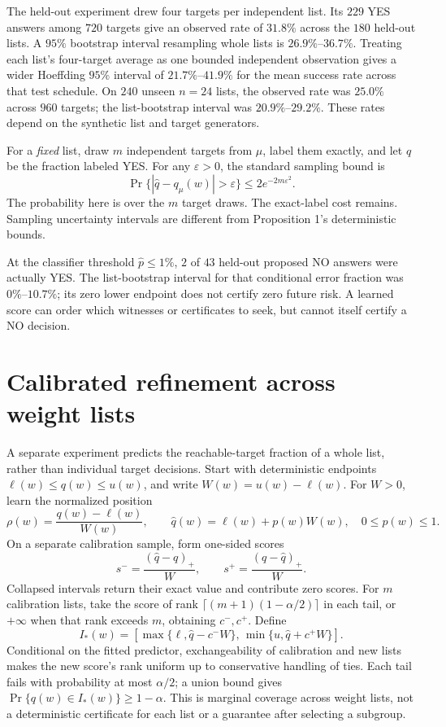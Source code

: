 \documentclass[10pt,english]{article}
\begin{document}
The held-out experiment drew four targets per independent list. Its \(229\) YES answers among \(720\) targets give an observed rate of \(31.8\%\) across the \(180\) held-out lists. A \(95\%\) bootstrap interval resampling whole lists is \(26.9\%\)--\(36.7\%\). Treating each list's four-target average as one bounded independent observation gives a wider Hoeffding \(95\%\) interval of \(21.7\%\)--\(41.9\%\) for the mean success rate across that test schedule. On \(240\) unseen \(n=24\) lists, the observed rate was \(25.0\%\) across \(960\) targets; the list-bootstrap interval was \(20.9\%\)--\(29.2\%\). These rates depend on the synthetic list and target generators.

For a \emph{fixed} list, draw \(m\) independent targets from \(\mu\),
label them exactly, and let \(\widehat q\) be the fraction labeled YES.
For any \(\varepsilon>0\), the standard sampling bound is
\[
\Pr\{|\widehat q-q_\mu(w)|>\varepsilon\}\le 2e^{-2m\varepsilon^2}.
\]
The probability here is over the \(m\) target draws. The exact-label
cost remains. Sampling uncertainty intervals are different from
Proposition 1's deterministic bounds.

At the classifier threshold \(\widehat p\le1\%\), \(2\) of \(43\) held-out proposed NO answers were actually YES. The list-bootstrap interval for that conditional error fraction was \(0\%\)--\(10.7\%\); its zero lower endpoint does not certify zero future risk. A learned score can order which witnesses or certificates to seek, but cannot itself certify a NO decision.

\section{Calibrated refinement across weight lists}
A separate experiment predicts the reachable-target fraction of a whole
list, rather than individual target decisions. Start with deterministic
endpoints \(\ell(w)\le q(w)\le u(w)\), and write
\(W(w)=u(w)-\ell(w)\). For \(W>0\), learn the normalized position
\[
\rho(w)=\frac{q(w)-\ell(w)}{W(w)},\qquad
\widehat q(w)=\ell(w)+p(w)W(w),\quad 0\le p(w)\le1.
\]
On a separate calibration sample, form one-sided scores
\[
s^-=\frac{(\widehat q-q)_+}{W},\qquad
s^+=\frac{(q-\widehat q)_+}{W}.
\]
Collapsed intervals return their exact value and contribute zero scores.
For \(m\) calibration lists, take the score of rank
\(\lceil(m+1)(1-\alpha/2)\rceil\) in each tail, or \(+\infty\)
when that rank exceeds \(m\), obtaining \(c^-,c^+\). Define
\[
I_*(w)=\left[
 \max\{\ell,\widehat q-c^-W\},\,
 \min\{u,\widehat q+c^+W\}\right].
\]
Conditional on the fitted predictor, exchangeability of calibration and
new lists makes the new score's rank uniform up to conservative handling
of ties. Each tail fails with probability at most \(\alpha/2\); a union
bound gives \(\Pr\{q(w)\in I_*(w)\}\ge1-\alpha\). This is marginal
coverage across weight lists, not a deterministic certificate for each
list or a guarantee after selecting a subgroup.
\end{document}
